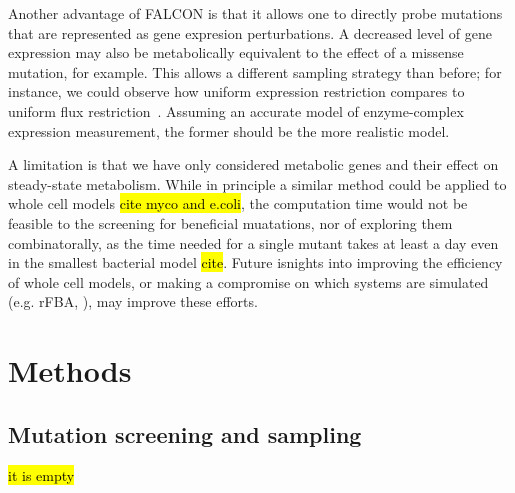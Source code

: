 Another advantage of FALCON is that it allows one to directly probe
mutations that are represented as gene expresion perturbations. A
decreased level of gene expression may also be metabolically
equivalent to the effect of a missense mutation, for example. This
allows a different sampling strategy than before; for instance, we
could observe how uniform expression restriction compares to uniform
flux restriction~\citep{Xu2012}. Assuming an accurate model of
enzyme-complex expression measurement, the former should be the more
realistic model.

A limitation is that we have only considered metabolic genes and their
effect on steady-state metabolism. While in principle a similar method
could be applied to whole cell models \hl{cite myco and e.coli}, the
computation time would not be feasible to the screening for beneficial
muatations, nor of exploring them combinatorally, as the time needed
for a single mutant takes at least a day even in the smallest
bacterial model \hl{cite}. Future isnights into improving the
efficiency of whole cell models, or making a compromise on which
systems are simulated (e.g. rFBA, \citep{Covert2001}), may improve
these efforts.

\section{Methods}
\label{sec:epiBeneMethod}

\subsection{Mutation screening and sampling}
\label{sec:epiBeneMethodSS}
\hl{it is empty}








